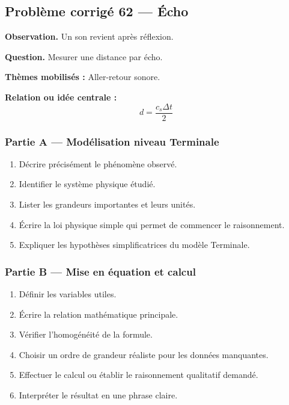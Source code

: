 \documentclass[11pt,a4paper]{article}
\begin{document}
\subsection{Problème corrigé 62 — Écho}

\begin{exercicebox}
\textbf{Observation.} Un son revient après réflexion.

\medskip
\textbf{Question.} Mesurer une distance par écho.

\medskip
\textbf{Thèmes mobilisés :} Aller-retour sonore.

\medskip
\textbf{Relation ou idée centrale :}
\[
d=\frac{c_s\Delta t}{2}
\]
\end{exercicebox}

\subsubsection*{Partie A — Modélisation niveau Terminale}

\begin{enumerate}
  \item Décrire précisément le phénomène observé.
  \item Identifier le système physique étudié.
  \item Lister les grandeurs importantes et leurs unités.
  \item Écrire la loi physique simple qui permet de commencer le raisonnement.
  \item Expliquer les hypothèses simplificatrices du modèle Terminale.
\end{enumerate}

\subsubsection*{Partie B — Mise en équation et calcul}

\begin{enumerate}
  \item Définir les variables utiles.
  \item Écrire la relation mathématique principale.
  \item Vérifier l'homogénéité de la formule.
  \item Choisir un ordre de grandeur réaliste pour les données manquantes.
  \item Effectuer le calcul ou établir le raisonnement qualitatif demandé.
  \item Interpréter le résultat en une phrase claire.
\end{enumerate}
\end{document}
